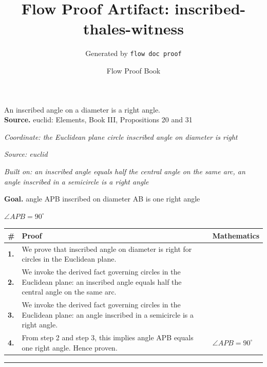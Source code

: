 \documentclass[11pt]{article}
\title{Flow Proof Artifact: inscribed-thales-witness}
\author{Generated by \texttt{flow doc proof}}
\date{Flow Proof Book}
\theoremstyle{definition}
\begin{document}
\maketitle
An inscribed angle on a diameter is a right angle.\\[0.5em]
\textbf{Source.} euclid: Elements, Book III, Propositions 20 and 31\\[0.5em]
\bigskip
{}\par
\smallskip\noindent\textit{Coordinate: the Euclidean plane \cdot circle \cdot inscribed angle on diameter is right}\par
\smallskip\noindent\textit{Source: euclid}\par
\smallskip\noindent\textit{Built on: an inscribed angle equals half the central angle on the same arc, an angle inscribed in a semicircle is a right angle}\par
\medskip
\noindent\textbf{Goal.} angle APB inscribed on diameter AB is one right angle\par
\noindent$\displaystyle \angle APB = 90^\circ$\par
\medskip
\noindent
\begin{tabular}{@{} >{\raggedright\arraybackslash}p{} >{\raggedright\arraybackslash}p{} >{\raggedleft\arraybackslash}p{} @{}}
\textbf{\#} & \textbf{Proof} & \textbf{Mathematics} \\
\midrule
\textbf{1.} & We prove that inscribed angle on diameter is right for circles in the Euclidean plane. & \\[0.45em]
\textbf{2.} & We invoke the derived fact governing circles in the Euclidean plane: an inscribed angle equals half the central angle on the same arc. & \\[0.45em]
\textbf{3.} & We invoke the derived fact governing circles in the Euclidean plane: an angle inscribed in a semicircle is a right angle. & \\[0.45em]
\textbf{4.} & From step 2 and step 3, this implies angle APB equals one right angle. Hence proven. & $\displaystyle \angle APB = 90^\circ$ \\[0.45em]
\bottomrule
\end{tabular}
\label{thm:Geometry-circle-inscribed_angle_on_diameter_is_right}
\par\medskip\hrule
\end{document}
